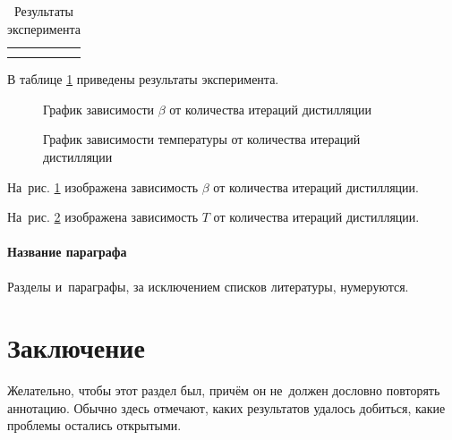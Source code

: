 \documentclass[12pt, twoside]{article}
\begin{document}
\begin{table}[h]
    \centering
    \begin{tabular}{c|c}
         &  \\
         & 
    \end{tabular}
    \caption{Результаты эксперимента}
    \label{tab:experiment_results}
\end{table}

В таблице \ref{tab:experiment_results} приведены результаты эксперимента.

\begin{figure}[h]
    \centering
    \caption{График зависимости $\beta$ от количества итераций дистилляции}
    \label{fig:iter_beta}
\end{figure}

\begin{figure}[h]
    \centering
    \caption{График зависимости температуры от количества итераций дистилляции}
    \label{fig:iter_temp}
\end{figure}

На~рис. \ref{fig:iter_beta} изображена зависимость $\beta$ от количества итераций дистилляции.

На~рис. \ref{fig:iter_temp} изображена зависимость $T$ от количества итераций дистилляции.

\paragraph{Название параграфа}
Разделы и~параграфы, за исключением списков литературы, нумеруются.

\section{Заключение}
Желательно, чтобы этот раздел был, причём он не~должен дословно повторять аннотацию.
Обычно здесь отмечают, каких результатов удалось добиться, какие проблемы остались открытыми.






\end{document}

